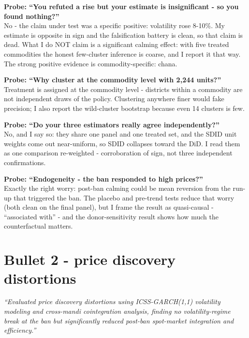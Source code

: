 \documentclass[11pt]{article}
\newcommand{\Q}[1]{\smallskip\noindent\textbf{Probe: #1}\\}
\begin{document}
\Q{``You refuted a rise but your estimate is insignificant - so you found nothing?''}
No - the claim under test was a specific positive: volatility rose 8-10\%. My estimate is
opposite in sign and the falsification battery is clean, so that claim is dead. What I do
NOT claim is a significant calming effect: with five treated commodities the honest
few-cluster inference is coarse, and I report it that way. The strong positive evidence is
commodity-specific: chana.

\Q{``Why cluster at the commodity level with 2{,}244 units?''}
Treatment is assigned at the commodity level - districts within a commodity are not
independent draws of the policy. Clustering anywhere finer would fake precision; I also
report the wild-cluster bootstrap because even 14 clusters is few.

\Q{``Do your three estimators really agree independently?''}
No, and I say so: they share one panel and one treated set, and the SDID unit weights come
out near-uniform, so SDID collapses toward the DiD. I read them as one comparison
re-weighted - corroboration of sign, not three independent confirmations.

\Q{``Endogeneity - the ban responded to high prices?''}
Exactly the right worry: post-ban calming could be mean reversion from the run-up that
triggered the ban. The placebo and pre-trend tests reduce that worry (both clean on the
final panel), but I frame the result as quasi-causal - ``associated with'' - and the
donor-sensitivity result shows how much the counterfactual matters.

\section{Bullet 2 - price discovery distortions}

\noindent\emph{``Evaluated price discovery distortions using ICSS-GARCH(1,1) volatility
modeling and cross-mandi cointegration analysis, finding no volatility-regime break at
the ban but significantly reduced post-ban spot-market integration and efficiency.''}
\end{document}
